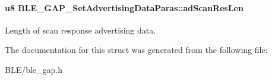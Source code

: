 \paragraph[{\texorpdfstring{ad\+Scan\+Res\+Len}{adScanResLen}}]{\setlength{\rightskip}{0pt plus 5cm}u8 B\+L\+E\+\_\+\+G\+A\+P\+\_\+\+Set\+Advertising\+Data\+Paras\+::ad\+Scan\+Res\+Len}\hypertarget{struct_b_l_e___g_a_p___set_advertising_data_paras_adb5f6ad2a2b6bb0003ade19598c05e3d}{}\label{struct_b_l_e___g_a_p___set_advertising_data_paras_adb5f6ad2a2b6bb0003ade19598c05e3d}
Length of scan response advertising data. 

The documentation for this struct was generated from the following file\+:\begin{DoxyCompactItemize}
\item 
B\+L\+E/ble\+\_\+gap.\+h\end{DoxyCompactItemize}
